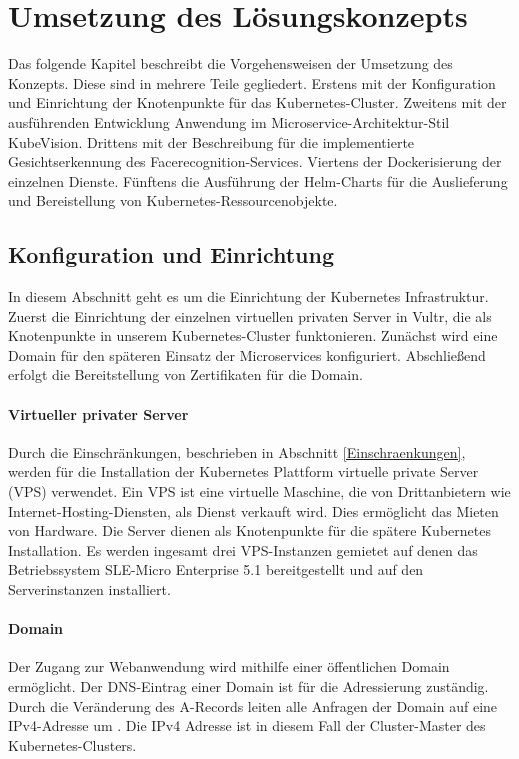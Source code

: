 \chapter{Umsetzung des Lösungskonzepts}

Das folgende Kapitel beschreibt die Vorgehensweisen der Umsetzung des Konzepts.
Diese sind in mehrere Teile gegliedert.
Erstens mit der Konfiguration und Einrichtung der Knotenpunkte für das Kubernetes-Cluster.
Zweitens mit der ausführenden Entwicklung Anwendung im Microservice-Architektur-Stil KubeVision.
Drittens mit der Beschreibung für die implementierte Gesichtserkennung des Facerecognition-Services.
Viertens der Dockerisierung der einzelnen Dienste.
Fünftens die Ausführung der Helm-Charts für die Auslieferung und Bereistellung von Kubernetes-Ressourcenobjekte. 

\section{Konfiguration und Einrichtung}\label{konfig}

In diesem Abschnitt geht es um die Einrichtung der Kubernetes Infrastruktur.
Zuerst die Einrichtung der einzelnen virtuellen privaten Server in Vultr, die als Knotenpunkte in unserem Kubernetes-Cluster funktonieren.
Zunächst wird eine Domain für den späteren Einsatz der Microservices konfiguriert.
Abschließend erfolgt die Bereitstellung von Zertifikaten für die Domain.

\subsubsection{Virtueller privater Server}

Durch die Einschränkungen, beschrieben in Abschnitt \ref{Einschraenkungen},
werden für die Installation der Kubernetes Plattform virtuelle private Server (VPS) verwendet.
Ein VPS ist eine virtuelle Maschine, die von Drittanbietern wie Internet-Hosting-Diensten, als Dienst verkauft wird.
Dies ermöglicht das Mieten von Hardware.
Die Server dienen als Knotenpunkte für die spätere Kubernetes Installation.
Es werden ingesamt drei VPS-Instanzen gemietet auf denen das Betriebssystem SLE-Micro Enterprise 5.1 bereitgestellt und auf den Serverinstanzen installiert.

\subsubsection{Domain}\label{Domain}
Der Zugang zur Webanwendung wird mithilfe einer öffentlichen Domain ermöglicht.
Der DNS-Eintrag einer Domain ist für die Adressierung zuständig.
Durch die Veränderung des A-Records leiten alle Anfragen der Domain auf eine IPv4-Adresse um \cite{LearningCoreDNS}.
Die IPv4 Adresse ist in diesem Fall der Cluster-Master des Kubernetes-Clusters.

